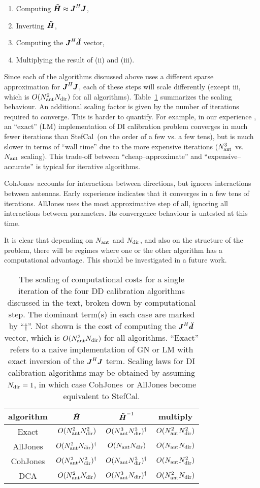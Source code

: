 \documentclass[useAMS,usenatbib]{mn2e}
\newcommand{\mat}[1]{{\bmath{#1}}}
\newcommand{\JJ}{\mat{J}} %
\newcommand{\HHa}{\mat{\tilde{H}}} %
\newcommand{\JHJ}{\JJ^H\JJ} %
\newcommand{\AUG}[1]{\bmath{\breve{#1}}}
\newcommand{\Dd}{\AUG{d}}
\newcommand{\COH}{{\sc CohJones}}
\newcommand{\StefCal}{{\sc StefCal}}
\numberwithin{equation}{section} %
\begin{document}
\begin{enumerate}
\item Computing $\HHa \approx \JHJ$,
\item Inverting $\HHa$,
\item Computing the $\JJ^H\Dd$ vector,
\item Multiplying the result of (ii) and (iii). 
\end{enumerate}

Since each of the algorithms discussed above uses a different sparse approximation for $\JHJ$, each of these 
steps will scale differently (except iii, which is $O(N_\mathrm{ant}^2N_\mathrm{dir})$ for all algorithms). Table~\ref{tab:costs} 
summarizes the scaling behaviour. 
An additional scaling factor is given by the number of iterations required to converge. This is harder
to quantify. For example, in our experience \citep{OMS-Stefcal}, an ``exact'' (LM) implementation of
DI calibration problem converges in much fewer iterations than \StefCal\ (on the order of a few vs. a few tens), but is much 
slower in terms of ``wall time'' due to the more expensive iterations ($N_\mathrm{ant}^3$ vs. $N_\mathrm{ant}$ scaling). This trade-off  
between ``cheap--approximate'' and ``expensive--accurate'' is typical for iterative algorithms. 

\COH\ accounts for interactions between directions, but ignores interactions between antennas. Early experience 
indicates that it converges in a few tens of iterations. {\sc AllJones} uses the most approximative step of all,
ignoring all interactions between parameters. Its convergence behaviour is untested at this time.

It is clear that depending on $N_\mathrm{ant}$ and $N_\mathrm{dir}$, and also on the structure of the problem, there will be 
regimes where one or the other algorithm has a computational advantage. This should be investigated in a future work.


\begin{table}
\caption{\label{tab:costs}The scaling of computational costs for a single iteration of the 
four DD calibration algorithms discussed in the text, broken down by computational step. 
The dominant term(s) in each case are marked by ``$\dagger$''. Not shown is the cost of computing the $\JJ^H\Dd$ 
vector, which is $O(N_\mathrm{ant}^2N_\mathrm{dir})$ for all algorithms. ``Exact'' refers to a naive implementation of GN or LM with exact 
inversion of the $\JHJ$ term. Scaling laws for DI calibration algorithms may be obtained by assuming $N_\mathrm{dir}=1$, in which
case \COH\ or {\sc AllJones} become equivalent to \StefCal. 
}
\begin{tabular}{c|ccc}
\hline
algorithm & $\HHa$ & $\HHa^{-1}$ & multiply \\
\hline
Exact          & $O(N_\mathrm{ant}^2N_\mathrm{dir}^2)$ & $O(N_\mathrm{ant}^3N_\mathrm{dir}^3)^\dagger$ &  $O(N_\mathrm{ant}^2N_\mathrm{dir}^2)$ \\ 
{\sc AllJones} & $O(N_\mathrm{ant}^2N_\mathrm{dir})^\dagger$   & $O(N_\mathrm{ant}N_\mathrm{dir})$     &  $O(N_\mathrm{ant}N_\mathrm{dir})$ \\
\COH           & $O(N_\mathrm{ant}^2N_\mathrm{dir}^2)^\dagger$ & $O(N_\mathrm{ant}N_\mathrm{dir}^3)^\dagger$   &  $O(N_\mathrm{ant}N_\mathrm{dir}^2)$ \\
DCA            & $O(N_\mathrm{ant}^2N_\mathrm{dir})$   & $O(N_\mathrm{ant}^3N_\mathrm{dir})^\dagger$   &  $O(N_\mathrm{ant}^2N_\mathrm{dir})$ \\
\hline
\end{tabular}
\end{table}
\end{document}
